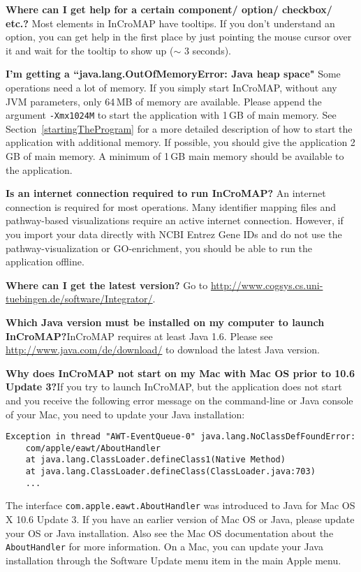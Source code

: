 \noindent \textbf{Where can I get help for a certain component/ option/ checkbox/ etc.?}\newline
Most elements in InCroMAP have tooltips. If you don't understand an option, you
can get help in the first place by just pointing the mouse cursor over it and
wait for the tooltip to show up ($\sim$ 3 seconds).\newline

\noindent \textbf{I'm getting a ``java.lang.OutOfMemoryError: Java heap space"}\newline
Some operations need a lot of memory. If you simply start InCroMAP, without any
JVM parameters, only 64\,MB of memory are available. Please append the argument
\texttt{-Xmx1024M} to start the application with 1\,GB of main memory. See
Section~\vref{startingTheProgram} for a more detailed description of how to
start the application with additional memory. If possible, you should give the
application 2\,GB of main memory. A minimum of 1\,GB main memory should be
available to the application.\newline

\noindent \textbf{Is an internet connection required to run InCroMAP?}\newline
An internet connection is required for most operations. Many identifier mapping
files and pathway-based visualizations require an active internet connection.
However, if you import your data directly with NCBI Entrez Gene IDs and do not
use the pathway-visualization or GO-enrichment, you should be able to run the
application offline.\newline

\noindent \textbf{Where can I get the latest version?}\newline
Go to \url{http://www.cogsys.cs.uni-tuebingen.de/software/Integrator/}.\newline

\noindent \textbf{Which Java version must be installed on my computer to launch
InCroMAP?}\newline InCroMAP requires at least Java 1.6. Please see
\url{http://www.java.com/de/download/} to download the latest Java version.

\noindent \textbf{Why does InCroMAP not start on my Mac with Mac OS prior to
10.6 Update 3?}\newline If you try to launch InCroMAP, but the application does
not start and you receive the following error message on the command-line or
Java console of your Mac, you need to update your Java installation:
\begin{verbatim}
Exception in thread "AWT-EventQueue-0" java.lang.NoClassDefFoundError:
    com/apple/eawt/AboutHandler
    at java.lang.ClassLoader.defineClass1(Native Method)
    at java.lang.ClassLoader.defineClass(ClassLoader.java:703)
    ...
\end{verbatim}
The interface \texttt{com.apple.eawt.AboutHandler} was introduced to Java for
Mac OS X 10.6 Update 3. If you have an earlier version of Mac OS or Java,
please update your OS or Java installation. Also see the Mac OS documentation
about the \texttt{AboutHandler} for more information. On a Mac, you can update
your Java installation through the Software Update menu item in the main Apple
menu.

